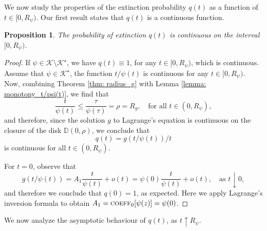\documentclass[11pt,a4paper,leqno]{amsart}
\theoremstyle{plain}
\newtheorem{propo}[theo]{Proposition}
\theoremstyle{definition}
\numberwithin{equation}{section}
\def\K{\mathcal{K}}
\begin{document}
	We now study the properties of the extinction probability \( q(t) \) as a function of $t \in [0,R_{\psi})$. Our first result states that $q(t)$ is a continuous function. 
	\begin{propo} The probability of extinction \( q(t) \) is continuous on the interval \( [0, R_{\psi}) \).
	\end{propo}
	\begin{proof} If $\psi \in \K \setminus \K^{\star}$, we have $q(t) \equiv 1$, for any $t \in [0,R_{\psi})$, which is continuous. Assume that \( \psi \in \K^{\star} \), the function \( t/\psi(t) \) is continuous for any \( t \in [0, R_{\psi}) \). Now, combining Theorem \ref{thm: radius_g} with Lemma \ref{lemma: monotony_t/psi(t)}, we find that
		\[
		\frac{t}{\psi(t)} \leq \frac{\tau}{\psi(\tau)} = \rho = R_g, \quad \text{for all } t \in (0, R_{\psi}),
		\]
		and therefore, since the solution \( g \) to Lagrange's equation is continuous on the closure of the disk \( \mathbb{D}(0, \rho) \), we conclude that
		\[
		q(t) = {g(t/\psi(t))}/{t}
		\]
		is continuous for all \( t \in (0, R_{\psi}) \).
		\smallskip
		
		For \( t = 0 \), observe that
		\[
		g(t/\psi(t)) = A_1 \frac{t}{\psi(t)} + o(t) = \psi(0) \frac{t}{\psi(t)} + o(t), \quad \text{as } t \downarrow 0,
		\]
		and therefore we conclude that \( q(0) = 1 \), as expected. Here we apply Lagrange’s inversion formula to obtain \( A_1 = \textsc{coeff}_0[\psi(z)] =  \psi(0)\).
	\end{proof}
	\smallskip
	
	We now analyze the asymptotic behaviour of $q(t)$, as $t \uparrow R_{\psi}$.
	
\end{document}
